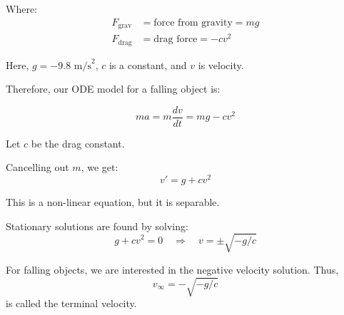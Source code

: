 \documentclass{article}
\begin{document}

Where:
\begin{align*}
    F_\text{grav} &= \text{force from gravity} = mg \\
    F_\text{drag} &= \text{drag force} = -cv^2
\end{align*}

Here, $g = -9.8 \text{ m/s}^2$, $c$ is a constant, and $v$ is velocity.

Therefore, our ODE model for a falling object is:

\[ma = m\frac{dv}{dt} = mg - cv^2\]


\noindent
Let $c$ be the drag constant.

\vspace{0.5em}

Cancelling out $m$, we get:
\[
v' = g + cv^2
\]

This is a non-linear equation, but it is separable.

\vspace{0.5em}

Stationary solutions are found by solving:
\[
g + cv^2 = 0 \quad \Rightarrow \quad v = \pm\sqrt{-g/c}
\]

For falling objects, we are interested in the negative velocity solution. Thus,
\[
v_\infty = -\sqrt{-g/c}
\]
is called the terminal velocity.

\vspace{0.5em}
\end{document}
